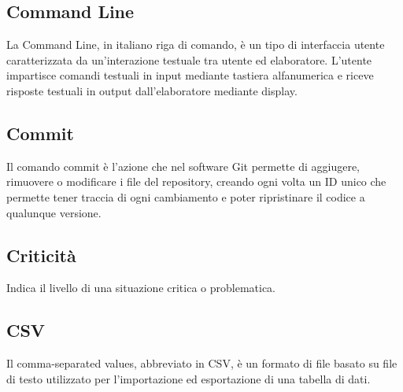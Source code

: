\subsection*{Command Line}
La Command Line, in italiano riga di comando, è un tipo di interfaccia utente caratterizzata da un'interazione testuale tra utente ed elaboratore. L'utente impartisce comandi testuali in input mediante tastiera alfanumerica e riceve risposte testuali in output dall'elaboratore mediante display.

\subsection*{Commit}
Il comando commit è l'azione che nel software Git permette di aggiugere, rimuovere o modificare i file del repository, creando ogni volta un ID unico che permette tener traccia di ogni cambiamento e poter ripristinare il codice a qualunque versione.

\subsection*{Criticità}
Indica il livello di una situazione critica o problematica.

\subsection*{CSV}
Il comma-separated values, abbreviato in CSV, è un formato di file basato su file di testo utilizzato per l'importazione ed esportazione di una tabella di dati.

